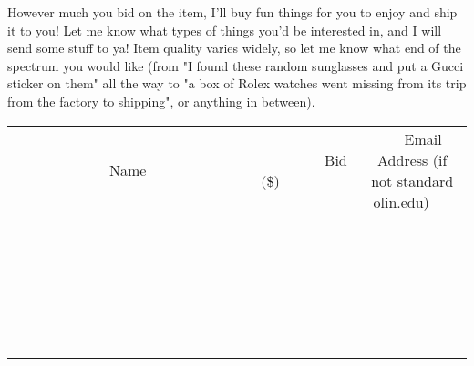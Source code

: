 \documentclass[11pt]{article}
\begin{document}
However much you bid on the item, I'll buy fun things for you to enjoy and ship it to you! Let me know what types of things you'd be interested in, and I will send some stuff to ya! Item quality varies widely, so let me know what end of the spectrum you would like (from "I found these random sunglasses and put a Gucci sticker on them" all the way to "a box of Rolex watches went missing from its trip from the factory to shipping", or anything in between).
\\[6ex]
\begin{tabular}{c c c}
~~~~~~~~~~~~~Name~~~~~~~~~~~~~ & ~~~~~~~~~Bid (\$)~~~~~~~~~  & ~~~Email Address (if not standard olin.edu)~~~\\
 & & \\
\hline
 & & \\
\hline
 & & \\
\hline
 & & \\
\hline
 & & \\
\hline
 & & \\
\hline
 & & \\
\hline
 & & \\
\hline
 & & \\
\hline
 & & \\
\hline
 & & \\
\hline
 & & \\
\hline
 & & \\
\hline
 & & \\
\hline
 & & \\
\hline
 & & \\
\hline
 & & \\
\hline
 & & \\
\hline
 & & \\
\hline
 & & \\
\hline
 & & \\
\hline
 & & \\
\hline
 & & \\
\hline
 & & \\
\hline
 & & \\
\hline
 & & \\
\hline
\end{tabular}
\newpage
\end{document}
